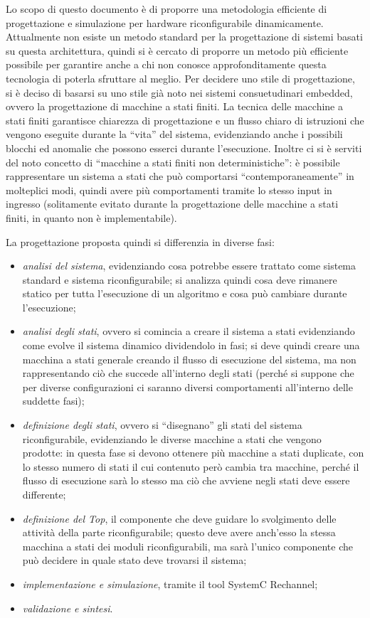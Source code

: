 \documentclass[a4paper,titlepage]{book}
\begin{document}
Lo scopo di questo documento è di proporre una metodologia efficiente di progettazione e simulazione per hardware riconfigurabile dinamicamente. Attualmente non esiste un metodo standard per la progettazione di sistemi basati su questa architettura, quindi si è cercato di proporre un metodo più efficiente possibile per garantire anche a chi non conosce approfonditamente questa tecnologia di poterla sfruttare al meglio.
Per decidere uno stile di progettazione, si è deciso di basarsi su uno stile già noto nei sistemi consuetudinari embedded, ovvero la progettazione di macchine a stati finiti. La tecnica delle macchine a stati finiti garantisce chiarezza di progettazione e un flusso chiaro di istruzioni che vengono eseguite durante la ``vita'' del sistema, evidenziando anche i possibili blocchi ed anomalie che possono esserci durante l'esecuzione. Inoltre ci si è serviti del noto concetto di ``macchine a stati finiti non deterministiche'': è possibile rappresentare un sistema a stati che può comportarsi ``contemporaneamente'' in molteplici modi, quindi avere più comportamenti tramite lo stesso input in ingresso (solitamente evitato durante la progettazione delle macchine a stati finiti, in quanto non è implementabile).

La progettazione proposta quindi si differenzia in diverse fasi:

\begin{itemize}
  \item \textit{analisi del sistema}, evidenziando cosa potrebbe essere trattato come sistema standard e sistema riconfigurabile; si analizza quindi cosa deve rimanere statico per tutta l'esecuzione di un algoritmo e cosa può cambiare durante l'esecuzione;
  \item \textit{analisi degli stati}, ovvero si comincia a creare il sistema a stati evidenziando come evolve il sistema dinamico dividendolo in fasi; si deve quindi creare una macchina a stati generale creando il flusso di esecuzione del sistema, ma non rappresentando ciò che succede all'interno degli stati (perché si suppone che per diverse configurazioni ci saranno diversi comportamenti all'interno delle suddette fasi);
  \item \textit{definizione degli stati}, ovvero si ``disegnano'' gli stati del sistema riconfigurabile, evidenziando le diverse macchine a stati che vengono prodotte: in questa fase si devono ottenere più macchine a stati duplicate, con lo stesso numero di stati il cui contenuto però cambia tra macchine, perché il flusso di esecuzione sarà lo stesso ma ciò che avviene negli stati deve essere differente;
  \item \textit{definizione del Top}, il componente che deve guidare lo svolgimento delle attività della parte riconfigurabile; questo deve avere anch'esso la stessa macchina a stati dei moduli riconfigurabili, ma sarà l'unico componente che può decidere in quale stato deve trovarsi il sistema;
  \item \textit{implementazione e simulazione}, tramite il tool SystemC Rechannel;
  \item \textit{validazione e sintesi}.
\end{itemize}
\end{document}
